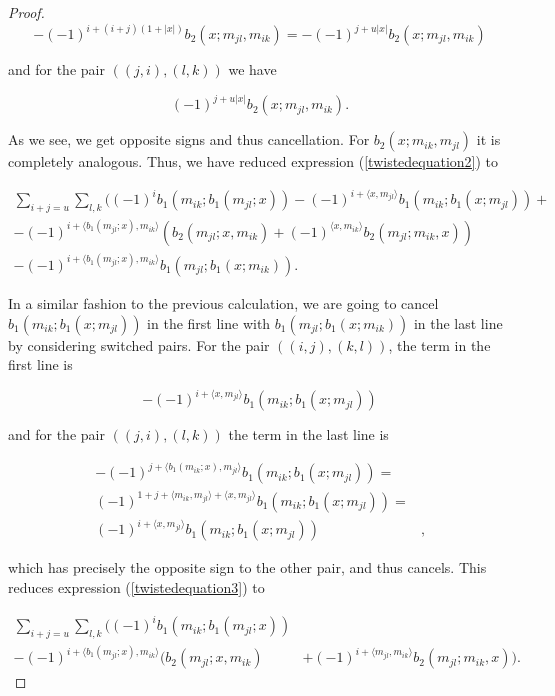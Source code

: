 \documentclass[Thesis.tex]{subfiles}
\begin{document}
\begin{proof}
\[-(-1)^{i+(i+j)(1+|x|)}b_2(x;m_{jl},m_{ik})=-(-1)^{j+u|x|}b_2(x;m_{jl},m_{ik})\]

and for the pair $((j,i),(l,k))$ we have

\[(-1)^{j+u|x|}b_2(x;m_{jl},m_{ik}).\]

As we see, we get opposite signs and thus cancellation. For $b_2(x;m_{ik},m_{jl})$ it is completely analogous. Thus, we have reduced expression (\ref{twistedequation2}) to

\begin{align}\label{twistedequation3}
\sum_{i+j=u}\sum_{l,k}((-1)^ib_1(m_{ik}; b_1(m_{jl};x))-(-1)^{i+\langle x,m_{jl}\rangle}b_1(m_{ik};b_1(x;m_{jl}))+\nonumber\\
 -(-1)^{i+\langle b_1(m_{jl};x),m_{ik}\rangle}(b_2(m_{jl};x,m_{ik})+(-1)^{\langle x,m_{ik}\rangle}b_2(m_{jl};m_{ik},x))\nonumber\\
 -(-1)^{i+\langle b_1(m_{jl};x),m_{ik}\rangle}b_1(m_{jl};b_1(x;m_{ik})).
\end{align}

In a similar fashion to the previous calculation, we are going to cancel $b_1(m_{ik};b_1(x;m_{jl}))$ in the first line with $b_1(m_{jl};b_1(x;m_{ik}))$ in the last line by considering switched pairs. For the pair $((i,j),(k,l))$, the term in the first line is 

\[-(-1)^{i+\langle x,m_{jl}\rangle}b_1(m_{ik};b_1(x;m_{jl}))\]

and for the pair $((j,i),(l,k))$ the term in the last line is

\begin{align*}
-(-1)^{j+\langle b_1(m_{ik};x),m_{jl}\rangle}b_1(m_{ik};b_1(x;m_{jl}))=&\\
(-1)^{1+j+\langle m_{ik},m_{jl}\rangle+\langle x,m_{jl}\rangle}b_1(m_{ik};b_1(x;m_{jl}))=&\\
(-1)^{i+\langle x,m_{jl}\rangle}b_1(m_{ik};b_1(x;m_{jl}))&,
\end{align*}

which has precisely the opposite sign to the other pair, and thus cancels. This reduces expression (\ref{twistedequation3}) to 

\begin{align}\label{twistedequation4}
\sum_{i+j=u}\sum_{l,k}((-1)^ib_1(m_{ik}; b_1(m_{jl};x))&\nonumber\\
 -(-1)^{i+\langle b_1(m_{jl};x),m_{ik}\rangle}(b_2(m_{jl};x,m_{ik})&+(-1)^{i+\langle m_{jl},m_{ik}\rangle}b_2(m_{jl};m_{ik},x)).
\end{align}


\end{proof}
\end{document}
